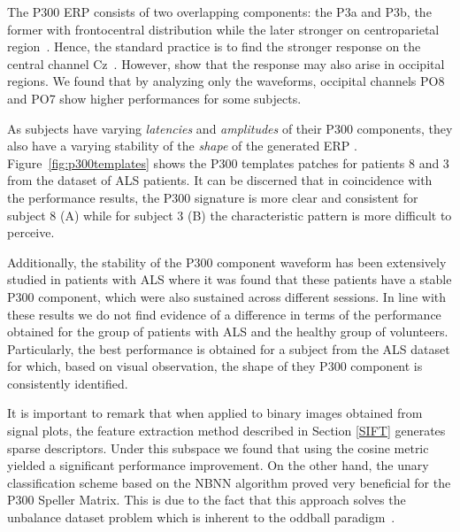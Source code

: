 \documentclass[utf8]{frontiersSCNS} %
\begin{document}
The P300 ERP  consists of two overlapping components: the P3a and P3b, the former with frontocentral distribution while the later stronger on centroparietal region~\citep{Polich2007}. Hence, the standard practice is to find the stronger response on the central channel Cz~\citep{Riccio2013}. However, \cite{Krusienski2006} show that the response may also arise in occipital regions.  We found that by analyzing only the waveforms, occipital channels PO8 and PO7 show higher performances for some subjects. 


As subjects have varying \textit{latencies} and \textit{amplitudes} of their P300 components, they also have a varying stability of the \textit{shape} of the generated ERP \citep{Nam2010}.  Figure~\ref{fig:p300templates} shows the P300 templates patches for patients 8 and 3 from the dataset of ALS patients. It can be discerned that in coincidence with the performance results, the P300 signature is more clear and consistent for subject 8 (A) while for subject 3 (B) the characteristic pattern is more difficult to perceive.

Additionally, the stability of the P300 component waveform has been extensively studied in patients with ALS \citep{SellersandEmanuelDonchin2006,TomohiroMadarame2008,Nijboer2009,Mak2012,McCane2015} where it was found that these patients have a stable P300 component, which were also sustained across different sessions.  In line with these results we do not find evidence of a difference in terms of the performance obtained for the group of patients with ALS and the healthy group of volunteers. Particularly, the best performance is obtained for a subject from the ALS dataset for which, based on visual observation, the shape of they P300 component is consistently identified.


It is important to remark that when applied to binary images obtained from signal plots, the feature extraction method described in Section \ref{SIFT} generates sparse descriptors.  Under this subspace we found that using the cosine metric yielded a significant performance improvement. On the other hand, the unary classification scheme based on the NBNN algorithm proved very beneficial for the P300 Speller Matrix.  This is due to the fact that this approach solves the unbalance dataset problem which is inherent to the oddball paradigm~\citep{Tibon2015}.  
\end{document}
